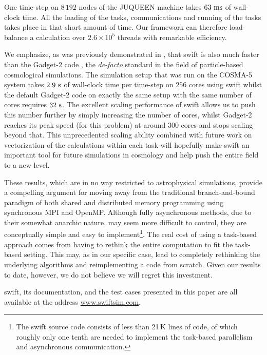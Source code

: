 \documentclass{sig-alternate-05-2015}
\newcommand{\gadget}{{\sc Gadget-2}\xspace}
\newcommand{\swift}{{\sc swift}\xspace}
\newcommand{\web}{\url{www.swiftsim.com}}
\begin{document}
One time-step on $8\,192$ nodes of the JUQUEEN machine takes $63~\rm{ms}$ of
wall-clock time. All the loading of the tasks, communications and running of the
tasks takes place in that short amount of time. Our framework can therefore
load-balance a calculation over $2.6\times10^5$ threads with remarkable
efficiency.

We emphasize, as was previously demonstrated in \cite{ref:Gonnet2015}, that \swift
is also much faster than the \gadget code \cite{Springel2005}, the
\emph{de-facto} standard in the field of particle-based cosmological
simulations. The simulation setup that was run on the COSMA-5
system takes $2.9~\rm{s}$ of wall-clock time per time-step on $256$ cores using
\swift whilst the default \gadget code on exactly the same setup with the same
number of cores requires $32~\rm{s}$.
The excellent scaling
performance of \swift allows us to push this number further by simply increasing
the number of cores, whilst \gadget reaches its peak speed (for this problem) at
around 300 cores and stops scaling beyond that. This unprecedented scaling
ability combined with future work on vectorization of the calculations within
each task will hopefully make \swift an important tool for future simulations in
cosmology and help push the entire field to a new level.

These results, which are in no way restricted to astrophysical simulations,
provide a compelling argument for moving away from the traditional
branch-and-bound paradigm of both shared and distributed memory programming
using synchronous MPI and OpenMP.
Although fully asynchronous methods, due to their somewhat anarchic nature,
may seem more difficult to control, they are conceptually simple and easy
to implement\footnote{The \swift source code consists of less than 21\,K lines
of code, of which roughly only one tenth are needed to implement the task-based
parallelism and asynchronous communication.}.
The real cost of using a task-based approach comes from having
to rethink the entire computation to fit the task-based setting. This may,
as in our specific case, lead to completely rethinking the underlying
algorithms and reimplementing a code from scratch.
Given our results to date, however, we do not believe we will regret this
investment.

\swift, its documentation, and the test cases presented in this paper are all
available at the address \web.


\end{document}
